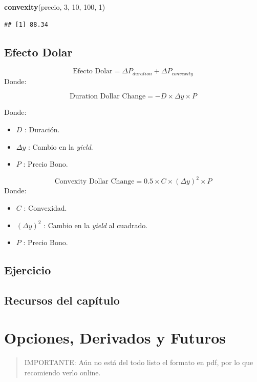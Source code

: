 \documentclass[12pt,]{book}
\newenvironment{Shaded}{\begin{snugshade}}{\end{snugshade}}
\newcommand{\KeywordTok}[1]{\textcolor[rgb]{0.13,0.29,0.53}{\textbf{#1}}}
\newcommand{\DecValTok}[1]{\textcolor[rgb]{0.00,0.00,0.81}{#1}}
\newcommand{\NormalTok}[1]{#1}
\providecommand{\tightlist}{%
  \setlength{\itemsep}{0pt}\setlength{\parskip}{0pt}}
\begin{document}
\begin{Shaded}
\begin{Highlighting}[]
\KeywordTok{convexity}\NormalTok{(precio, }\DecValTok{3}\NormalTok{, }\DecValTok{10}\NormalTok{, }\DecValTok{100}\NormalTok{, }\DecValTok{1}\NormalTok{)}
\end{Highlighting}
\end{Shaded}

\begin{verbatim}
## [1] 88.34
\end{verbatim}

\section{Efecto Dolar}\label{efecto-dolar}

\[
\text{Efecto Dolar} = \Delta P_{duration} + \Delta P_{convexity}  
\] Donde:

\[
\text{Duration Dollar Change} = -D \times \Delta y \times P 
\]

Donde:

\begin{itemize}
\tightlist
\item
  \(D\) : Duración.
\item
  \(\Delta y\) : Cambio en la \emph{yield}.
\item
  \(P\) : Precio Bono.
\end{itemize}

\[
\text{Convexity Dollar Change} = 0.5 \times C \times (\Delta y)^2 \times P 
\] Donde:

\begin{itemize}
\tightlist
\item
  \(C\) : Convexidad.
\item
  \((\Delta y)^2\) : Cambio en la \emph{yield} al cuadrado.
\item
  \(P\) : Precio Bono.
\end{itemize}

\section{Ejercicio}\label{ejercicio}

\section{Recursos del capítulo}\label{recursos-del-capitulo-1}

\chapter{Opciones, Derivados y Futuros}\label{options}

\begin{quote}
IMPORTANTE: Aún no está del todo listo el formato en pdf, por lo que
recomiendo verlo online.
\end{quote}


\end{document}
